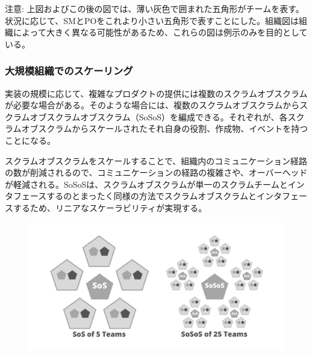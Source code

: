 \documentclass[12pt,a4paper,parskip=full]{scrartcl}
\begin{document}

注意: 上図およびこの後の図では、薄い灰色で囲まれた五角形がチームを表す。状況に応じて、SMとPOをこれより小さい五角形で表すことにした。組織図は組織によって大きく異なる可能性があるため、これらの図は例示のみを目的としている。

\subsubsection{大規模組織でのスケーリング}\label{scaling-in-larger-organizations}

実装の規模に応じて、複雑なプロダクトの提供には複数のスクラムオブスクラムが必要な場合がある。そのような場合には、複数のスクラムオブスクラムからスクラムオブスクラムオブスクラム（SoSoS）を編成できる。それぞれが、各スクラムオブスクラムからスケールされたそれ自身の役割、作成物、イベントを持つことになる。

スクラムオブスクラムをスケールすることで、組織内のコミュニケーション経路の数が削減されるので、コミュニケーションの経路の複雑さや、オーバーヘッドが軽減される。SoSoSは、スクラムオブスクラムが単一のスクラムチームとインタフェースするのとまったく同様の方法でスクラムオブスクラムとインタフェースするため、リニアなスケーラビリティが実現する。

\begin{figure}[H]
    \centering
    \includegraphics[scale=0.15]{2.png}
  
\end{figure}
\end{document}
